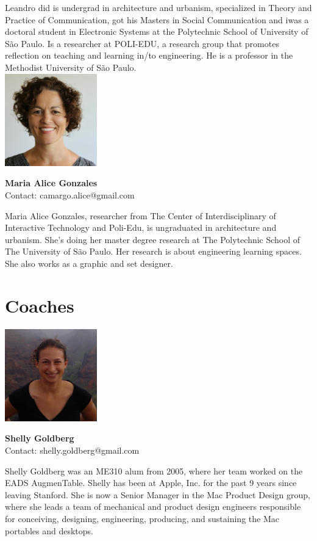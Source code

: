 Leandro did is undergrad in architecture and urbanism, specialized in Theory and Practice of Communication,  got his Masters in Social Communication and iwas a doctoral student in Electronic Systems at the Polytechnic School of University of São Paulo. Is a researcher at POLI-EDU, a research group that promotes reflection on teaching and learning  in/to engineering. He is a professor in the Methodist University of São Paulo.
\\ 
\noindent \includegraphics[width=40mm]{images/maria_alice.jpg}
\parbox[b]{0.6\textwidth}{\textbf{Maria Alice Gonzales}\\ 
Contact: camargo.alice@gmail.com \\
}

Maria Alice Gonzales, researcher from The Center of Interdisciplinary of Interactive Technology and Poli-Edu, is ungraduated in architecture and urbanism. She’s doing her master degree research at The Polytechnic School of The University of São Paulo. Her research is about engineering learning spaces. She also works as a graphic and set designer.


\section{Coaches}

\noindent \includegraphics[width=40mm]{images/shelly.png}
\parbox[b]{0.6\textwidth}{\textbf{Shelly Goldberg}\\ 
Contact: shelly.goldberg@gmail.com  \\
}

Shelly Goldberg was an ME310 alum from 2005, where her team worked on the EADS AugmenTable.  Shelly has been at Apple, Inc. for the past 9 years since leaving Stanford.  She is now a Senior Manager in the Mac Product Design group, where she leads a team of mechanical and product design engineers responsible for conceiving, designing, engineering, producing, and sustaining the Mac portables and desktops.  
\\

